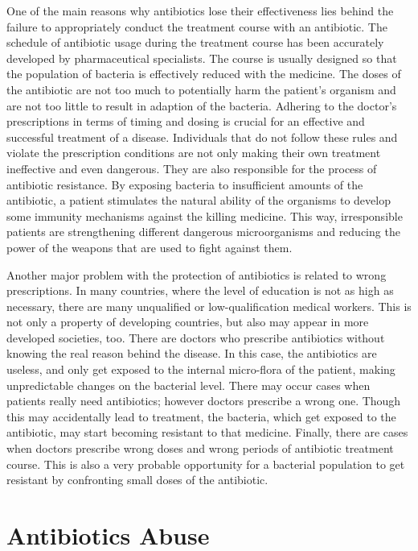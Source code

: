 One of the main reasons why antibiotics lose their effectiveness lies behind the failure to appropriately conduct the treatment course with an antibiotic. The schedule of antibiotic usage during the treatment course has been accurately developed by pharmaceutical specialists. The course is usually designed so that the population of bacteria is effectively reduced with the medicine. The doses of the antibiotic are not too much to potentially harm the patient’s organism and are not too little to result in adaption of the bacteria. Adhering to the doctor’s prescriptions in terms of timing and dosing is crucial for an effective and successful treatment of a disease. Individuals that do not follow these rules and violate the prescription conditions are not only making their own treatment ineffective and even dangerous. They are also responsible for the process of antibiotic resistance. By exposing bacteria to insufficient amounts of the antibiotic, a patient stimulates the natural ability of the organisms to develop some immunity mechanisms against the killing medicine. This way, irresponsible patients are strengthening different dangerous microorganisms and reducing the power of the weapons that are used to fight against them.

Another major problem with the protection of antibiotics is related to wrong prescriptions. In many countries, where the level of education is not as high as necessary, there are many unqualified or low-qualification medical workers. This is not only a property of developing countries, but also may appear in more developed societies, too. There are doctors who prescribe antibiotics without knowing the real reason behind the disease. In this case, the antibiotics are useless, and only get exposed to the internal micro-flora of the patient, making unpredictable changes on the bacterial level. There may occur cases when patients really need antibiotics; however doctors prescribe a wrong one. Though this may accidentally lead to treatment, the bacteria, which get exposed to the antibiotic, may start becoming resistant to that medicine. Finally, there are cases when doctors prescribe wrong doses and wrong periods of antibiotic treatment course. This is also a very probable opportunity for a bacterial population to get resistant by confronting small doses of the antibiotic.

\section{Antibiotics Abuse}

